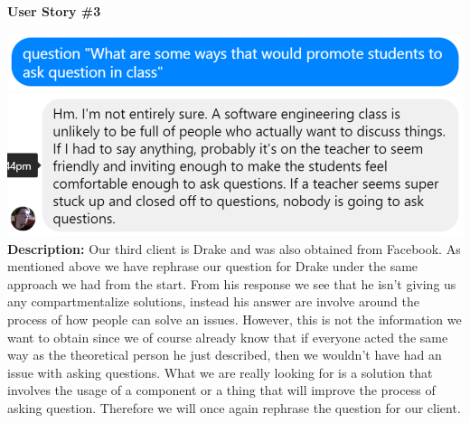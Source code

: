\documentclass[12pt]{article}
\begin{document}
\textbf{User Story \#3}
\begin{flushleft}
\includegraphics[width=\textwidth]{Assignment5_userstory_3a.eps}
\includegraphics[width=\textwidth]{Assignment5_userstory_3b.eps}
\textbf{Description:} Our third client is Drake and was also obtained from Facebook. As mentioned above we have rephrase our question for Drake under the same approach we had from the start. From his response we see that he isn't giving us any compartmentalize solutions, instead his answer are involve around the process of how people can solve an issues. However, this is not the information we want to obtain since we of course already know that if everyone acted the same way as the theoretical person he just described, then we wouldn't have had an issue with asking questions. What we are really looking for is a solution that involves the usage of a component or a thing that will improve the process of asking question. Therefore we will once again rephrase the question for our client.\newline
\end{flushleft}
\end{document}
